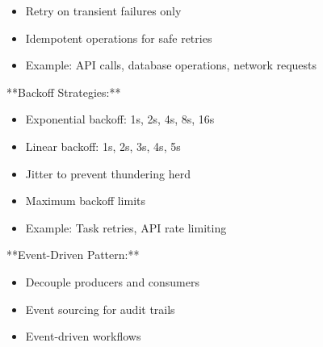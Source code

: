 \documentclass[11pt,a4paper]{article}
\begin{document}
\begin{itemize}
\item Retry on transient failures only
\end{itemize}

\begin{itemize}
\item Idempotent operations for safe retries
\end{itemize}

\begin{itemize}
\item Example: API calls, database operations, network requests
\end{itemize}

**Backoff Strategies:**

\begin{itemize}
\item Exponential backoff: 1s, 2s, 4s, 8s, 16s
\end{itemize}

\begin{itemize}
\item Linear backoff: 1s, 2s, 3s, 4s, 5s
\end{itemize}

\begin{itemize}
\item Jitter to prevent thundering herd
\end{itemize}

\begin{itemize}
\item Maximum backoff limits
\end{itemize}

\begin{itemize}
\item Example: Task retries, API rate limiting
\end{itemize}

**Event-Driven Pattern:**

\begin{itemize}
\item Decouple producers and consumers
\end{itemize}

\begin{itemize}
\item Event sourcing for audit trails
\end{itemize}

\begin{itemize}
\item Event-driven workflows
\end{itemize}
\end{document}
